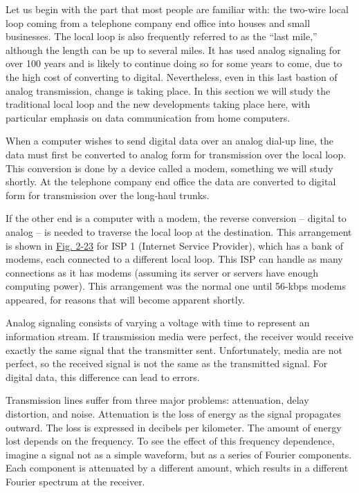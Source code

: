 Let us begin with the part that most people are familiar with: the
two-wire local loop coming from a telephone company end office into
houses and small businesses. The local loop is also frequently referred
to as the ``last mile,'' although the length can be up to several miles.
It has used analog signaling for over 100 years and is likely to
continue doing so for some years to come, due to the high cost of
converting to digital. Nevertheless, even in this last bastion of analog
transmission, change is taking place. In this section we will study the
traditional local loop and the new developments taking place here, with
particular emphasis on data communication from home computers.

When a computer wishes to send digital data over an analog dial-up line,
the data must first be converted to analog form for transmission over
the local loop. This conversion is done by a device called a modem,
something we will study shortly. At the telephone company end office the
data are converted to digital form for transmission over the long-haul
trunks.

If the other end is a computer with a modem, the reverse
conversion -- digital to analog -- is needed to traverse the local loop at
the destination. This arrangement is shown in
\protect\hyperlink{0130661023_ch02lev1sec5.htmlux5cux23ch02fig23}{Fig.
2-23} for ISP 1 (Internet Service Provider), which has a bank of modems,
each connected to a different local loop. This ISP can handle as many
connections as it has modems (assuming its server or servers have enough
computing power). This arrangement was the normal one until 56-kbps
modems appeared, for reasons that will become apparent shortly.

Analog signaling consists of varying a voltage with time to represent an
information stream. If transmission media were perfect, the receiver
would receive exactly the same signal that the transmitter sent.
Unfortunately, media are not perfect, so the received signal is not the
same as the transmitted signal. For digital data, this difference can
lead to errors.

Transmission lines suffer from three major problems: attenuation, delay
distortion, and noise. {Attenuation} is the loss of energy as the signal
propagates outward. The loss is expressed in decibels per kilometer. The
amount of energy lost depends on the frequency. To see the effect of
this frequency dependence, imagine a signal not as a simple waveform,
but as a series of Fourier components. Each component is attenuated by a
different amount, which results in a different Fourier spectrum at the
receiver.

